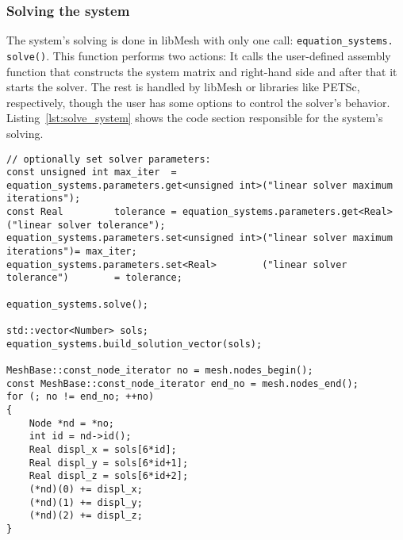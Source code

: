   \subsubsection{Solving the system}\label{sec:Impl-Details-Solving}
  The system's solving is done in libMesh with only one call:
  \texttt{equation\_systems.\,\!solve()}. This function performs two actions: It calls the user-defined assembly function that constructs the system matrix and right-hand side and after that it starts the solver. The rest is handled by libMesh or libraries like PETSc, respectively, though the user has some options to control the solver's behavior. Listing~\ref{lst:solve_system} shows the code section responsible for the system's solving.
\begin{lstlisting}[caption=Solve the system and build solution,label=lst:solve_system,keepspaces=true]
// optionally set solver parameters:
const unsigned int max_iter  = equation_systems.parameters.get<unsigned int>("linear solver maximum iterations");
const Real         tolerance = equation_systems.parameters.get<Real>("linear solver tolerance");
equation_systems.parameters.set<unsigned int>("linear solver maximum iterations")= max_iter;
equation_systems.parameters.set<Real>        ("linear solver tolerance")        = tolerance;

equation_systems.solve();

std::vector<Number> sols;
equation_systems.build_solution_vector(sols);

MeshBase::const_node_iterator no = mesh.nodes_begin();
const MeshBase::const_node_iterator end_no = mesh.nodes_end();
for (; no != end_no; ++no)
{
	Node *nd = *no;
	int id = nd->id();
	Real displ_x = sols[6*id];
	Real displ_y = sols[6*id+1];
	Real displ_z = sols[6*id+2];
	(*nd)(0) += displ_x;
	(*nd)(1) += displ_y;
	(*nd)(2) += displ_z;
}
\end{lstlisting}

